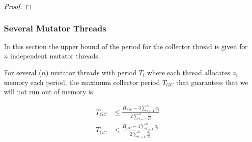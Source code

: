 \begin{proof}
%
%


%
%
%
%
%

\end{proof}

\subsubsection{Several Mutator Threads}

In this section the upper bound of the period for the collector
thread is given for $n$ independent mutator threads.

\begin{theorem}
\label{sch:theorem}

For several ($n$) mutator threads with period $T_i$ where each
thread allocates $a_i$ memory each period, the maximum collector
period $T_{GC}$ that guarantees that we will not run out of memory
is

\begin{align}\label{nth:mc:theorem}
    T_{GC} & \le \frac{H_{MC}-3\sum_{i=1}^{n} a_i}{2\sum_{i=1}^{n} \frac{a_i}{Ti}}\\
    \label{nth:cc:theorem}
    T_{GC} & \le \frac{H_{CC}-4\sum_{i=1}^{n} a_i}{2\sum_{i=1}^{n}
    \frac{a_i}{Ti}}
\end{align}

\end{theorem}

